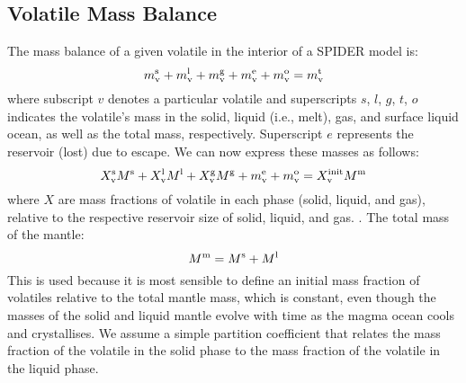 
\noindent {}

\subsection{Volatile Mass Balance}
The mass balance of a given volatile in the interior of a SPIDER model \citep[e.g.,][]{LMC13} is:
\begin{equation}
m_{\rm v}^{\rm s} + m_{\rm v}^{\rm l} + m_{\rm v}^{\rm g} + m_{\rm v}^{\rm e} + m_{\rm v}^{\rm o} = m_{\rm v}^{\rm t}
\end{equation}
where subscript $v$ denotes a particular volatile and superscripts $s$, $l$, $g$, $t$, $o$ indicates the volatile's mass in the solid, liquid (i.e., melt), gas, and surface liquid ocean, as well as the total mass, respectively.  Superscript $e$ represents the reservoir (lost) due to escape.  We can now express these masses as follows:
\begin{equation}
X_{\rm v}^{\rm s} M^{\rm s} + X_{\rm v}^{\rm l} M^{\rm l} + X_{\rm v}^{\rm g} M^{\rm g} + m_{\rm v}^{\rm e} + m_{\rm v}^{\rm o} = X_{\rm v}^{\rm init} M^{\rm m}
\end{equation}
where $X$ are mass fractions of volatile in each phase (solid, liquid, and gas), relative to the respective  reservoir size of solid, liquid, and gas.  . The total mass of the mantle:
\begin{equation}
M^{\rm m} = M^{\rm s} + M^{\rm l}
\end{equation}
This is used because it is most sensible to define an initial mass fraction of volatiles relative to the total mantle mass, which is constant, even though the masses of the solid and liquid mantle evolve with time as the magma ocean cools and crystallises.  We assume a simple partition coefficient that relates the mass fraction of the volatile in the solid phase to the mass fraction of the volatile in the liquid phase.
